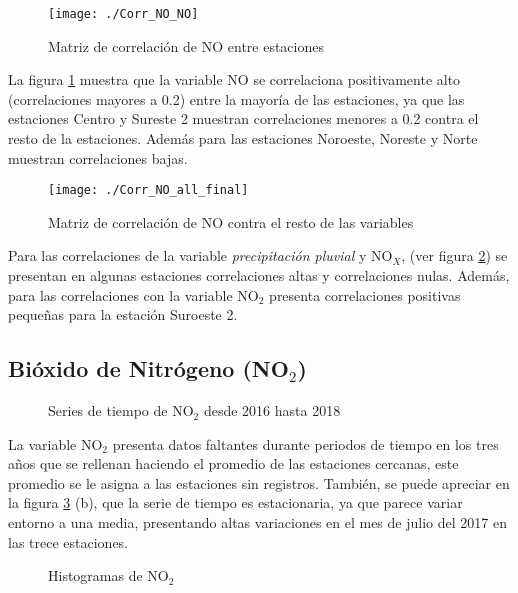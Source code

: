 \begin{figure}[H]
\centering
\texttt{[image: ./Corr\_NO\_NO]}
\caption{Matriz de correlación de NO entre estaciones }
\label{corrNONO}
\end{figure}

La figura \ref{corrNONO} muestra que la variable NO se correlaciona positivamente alto (correlaciones mayores a 0.2) entre la mayoría de las estaciones, ya que las estaciones Centro y Sureste 2 muestran correlaciones menores a 0.2 contra el resto de la estaciones. Además para las estaciones Noroeste, Noreste y Norte muestran correlaciones bajas.

\begin{figure}[H]
\centering
\texttt{[image: ./Corr\_NO\_all\_final]}
\caption{Matriz de correlación de NO contra el resto de las variables}
\label{corrNO}
\end{figure}


Para las correlaciones de la variable {\em precipitación pluvial} y NO$_{X}$, (ver figura \ref{corrNO}) se presentan en algunas estaciones correlaciones altas y correlaciones nulas. Además, para las correlaciones con la variable NO$_{2}$ presenta correlaciones positivas pequeñas para la estación Suroeste 2.





\subsection{Bióxido de Nitrógeno (NO$_{2}$)}
\begin{figure}[H]
\centering
{}
\caption{Series de tiempo de NO$_{2}$ desde 2016 hasta 2018}
\label{serieNO2}
\end{figure}

La variable NO$_{2}$ presenta datos faltantes durante periodos de tiempo en los tres años que se rellenan haciendo el promedio de las estaciones cercanas, este promedio se le asigna a las estaciones sin registros. También, se puede apreciar en la figura \ref{serieNO2} (b), que la serie de tiempo es estacionaria, ya que parece variar entorno a una media, presentando altas variaciones en el mes de julio del 2017 en las trece estaciones.

\begin{figure}[H]
\centering
{}
\caption{Histogramas de NO$_{2}$}
\label{histNO2}
\end{figure}

